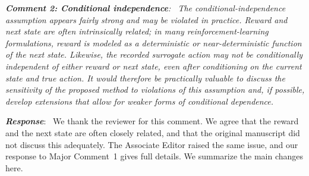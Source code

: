 \documentclass[12pt]{article}
\newcommand{\0}{\boldsymbol{0}}
\theoremstyle{definition}
\newcommand{\reviewcomment}[1]{\par\begingroup\itshape\noindent\textbf{#1}:\ }
\newcommand{\reviewresponse}{\par\endgroup\noindent\textbf{\textit{Response}}:\ }
\begin{document}
\reviewcomment{Comment 2: Conditional independence} The conditional-independence assumption appears fairly strong and may be violated in practice. Reward and next state are often intrinsically related; in many reinforcement-learning formulations, reward is modeled as a deterministic or near-deterministic function of the next state. Likewise, the recorded surrogate action may not be conditionally independent of either reward or next state, even after conditioning on the current state and true action. It would therefore be practically valuable to discuss the sensitivity of the proposed method to violations of this assumption and, if possible, develop extensions that allow for weaker forms of conditional dependence.
\reviewresponse
We thank the reviewer for this comment. We agree that the reward and the next state are often closely related, and that the original manuscript did not discuss this adequately. The Associate Editor raised the same issue, and our response to Major Comment~1 gives full details. We summarize the main changes here.
\end{document}
